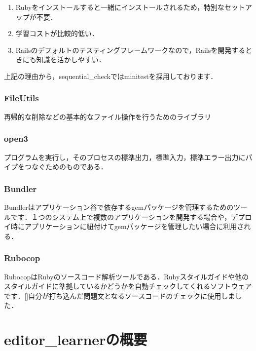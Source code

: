 \documentclass[11pt,dvipdfmx]{jsarticle}
\providecommand{\tightlist}{%
      \setlength{\itemsep}{0pt}\setlength{\parskip}{0pt}}
\begin{document}
\begin{enumerate}
\def\labelenumi{\arabic{enumi}.}
\tightlist
\item
  Rubyをインストールすると一緒にインストールされるため，特別なセットアップが不要．
\item
  学習コストが比較的低い．
\item
  Railsのデフォルトのテスティングフレームワークなので，Railsを開発するときにも知識を活かしやすい．
\end{enumerate}

上記の理由から，sequential\_checkではminitestを採用しております．

    \subsubsection{FileUtils}\label{fileutils}

    再帰的な削除などの基本的なファイル操作を行うためのライブラリ

    \subsubsection{open3}\label{open3}

    プログラムを実行し，そのプロセスの標準出力，標準入力，標準エラー出力にパイプをつなぐためのものである．

    \subsubsection{Bundler}\label{bundler}

Bundlerはアプリケーション谷で依存するgemパッケージを管理するためのツールです．１つのシステム上で複数のアプリケーションを開発する場合や，デプロイ時にアプリケーションに紐付けてgemパッケージを管理したい場合に利用される．

    \subsubsection{Rubocop}\label{rubocop}

RubocopはRubyのソースコード解析ツールである．Rubyスタイルガイドや他のスタイルガイドに準拠しているかどうかを自動チェックしてくれるソフトウェアです．{[}{]}自分が打ち込んだ問題文となるソースコードのチェックに使用しました．

    \section{editor\_learnerの概要}\label{editor_learnerux306eux6982ux8981}
\end{document}
